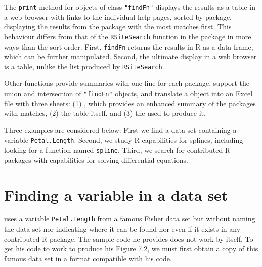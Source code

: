 The {\tt print} method for objects of class {\tt "findFn"}
displays the results as a table in a web
browser with links to the individual help pages, sorted by package,
displaying the results from the package with the most matches first.  This
behaviour differs from that of the {\tt RSiteSearch} function in the
 package in more ways than the sort order.  First, {\tt findFn}
returns the results in R as a data frame, which can be further
manipulated.  Second, the ultimate display in a web browser is a
table, unlike the list produced by {\tt RSiteSearch}.

Other  functions provide summaries with one line for each
package, support the union and intersection of {\tt "findFn"} objects,
and translate a  object into an Excel file with three sheets:
(1) , which provides an enhanced summary of the packages
with matches, (2) the  table itself, and (3) the 
used to produce it.

Three examples are considered below:  First we find a data set
containing a variable {\tt Petal.Length}. Second, we study
R capabilities for splines, including looking for a function
named {\tt spline}.  Third, we search for contributed R packages
 with capabilities for solving differential equations.

\section{Finding a variable in a data set}

\citet[pp. 282-283]{JC09} uses a variable {\tt Petal.Length} from a
famous Fisher data set but without naming the data set nor indicating
where it can be found nor even if it exists in any contributed R
package.  The sample code he provides does not work by itself.  To get
his code to  work to produce his Figure 7.2, we must first obtain a
copy of this famous data set in a format compatible with his code.

